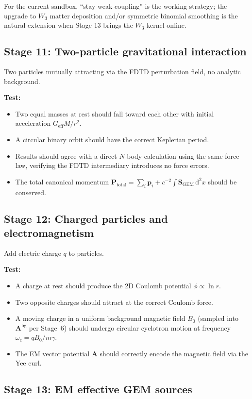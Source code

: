 \documentclass[11pt,a4paper]{article}
\newcommand{\vv}[1]{\mathbf{#1}}
\newcommand{\dd}{\mathrm{d}}
\begin{document}
For the current sandbox, ``stay weak-coupling'' is the working
strategy; the upgrade to $W_3$ matter deposition and/or symmetric
binomial smoothing is the natural extension when Stage 13 brings the
$W_3$ kernel online.

\subsection{Stage 11: Two-particle gravitational interaction}

Two particles mutually attracting via the FDTD perturbation field, no analytic background.

\textbf{Test:}
\begin{itemize}
  \item Two equal masses at rest should fall toward each other with initial acceleration $G_{\mathrm{eff}}M/r^2$.
  \item A circular binary orbit should have the correct Keplerian period.
  \item Results should agree with a direct $N$-body calculation using the same force law, verifying the FDTD intermediary introduces no force errors.
  \item The total canonical momentum $\vv{P}_{\mathrm{total}} = \sum_i\vv{p}_i + c^{-2}\int\vv{S}_{\mathrm{GEM}}\,\dd^2x$ should be conserved.
\end{itemize}

\subsection{Stage 12: Charged particles and electromagnetism}

Add electric charge $q$ to particles.

\textbf{Test:}
\begin{itemize}
  \item A charge at rest should produce the 2D Coulomb potential $\phi \propto \ln r$.
  \item Two opposite charges should attract at the correct Coulomb force.
  \item A moving charge in a uniform background magnetic field $B_0$ (sampled into $\vv{A}^{\mathrm{bg}}$ per Stage~6) should undergo circular cyclotron motion at frequency $\omega_c = qB_0/m\gamma$.
  \item The EM vector potential $\vv{A}$ should correctly encode the magnetic field via the Yee curl.
\end{itemize}

\subsection{Stage 13: EM effective GEM sources}
\end{document}
